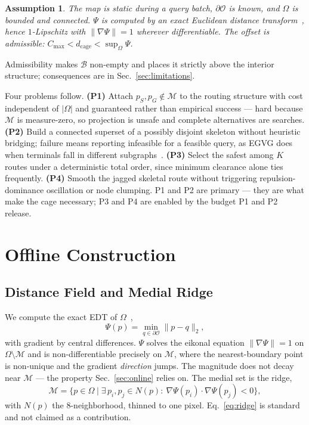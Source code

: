 \documentclass[conference]{IEEEtran}
\newtheorem{assumption}{Assumption}
\begin{document}
\begin{assumption}
\label{asm:setting}
The map is static during a query batch, $\partial\mathcal{O}$ is known, and $\Omega$ is bounded and connected. $\Psi$ is computed by an exact Euclidean distance transform~\cite{felzenszwalb2012}, hence $1$-Lipschitz with $\|\nabla\Psi\|=1$ wherever differentiable. The offset is admissible: $C_{\max}<d_{\mathrm{cage}}<\sup_{\Omega}\Psi$.
\end{assumption}

Admissibility makes $\mathcal{B}$ non-empty and places it strictly above the interior structure; consequences are in Sec.~\ref{sec:limitations}.

Four problems follow. \textbf{(P1)} Attach $p_S,p_G\notin\mathcal{M}$ to the routing structure with cost independent of $|\Omega|$ and guaranteed rather than empirical success --- hard because $\mathcal{M}$ is measure-zero, so projection is unsafe and complete alternatives are searches. \textbf{(P2)} Build a connected superset of a possibly disjoint skeleton without heuristic bridging; failure means reporting infeasible for a feasible query, as EGVG does when terminals fall in different subgraphs~\cite{qi2025egvg}. \textbf{(P3)} Select the safest among $K$ routes under a deterministic total order, since minimum clearance alone ties frequently. \textbf{(P4)} Smooth the jagged skeletal route without triggering repulsion-dominance oscillation or node clumping. P1 and P2 are primary --- they are what make the cage necessary; P3 and P4 are enabled by the budget P1 and P2 release.

\section{Offline Construction}
\label{sec:offline}

\subsection{Distance Field and Medial Ridge}

We compute the exact EDT of $\Omega$~\cite{felzenszwalb2012},
\begin{equation}
\Psi(p)=\min_{q\in\partial\mathcal{O}}\|p-q\|_2 ,
\end{equation}
with gradient by central differences. $\Psi$ solves the eikonal equation $\|\nabla\Psi\|=1$ on $\Omega\setminus\mathcal{M}$ and is non-differentiable precisely on $\mathcal{M}$, where the nearest-boundary point is non-unique and the gradient \emph{direction} jumps. The magnitude does not decay near $\mathcal{M}$ --- the property Sec.~\ref{sec:online} relies on. The medial set is the ridge,
\begin{equation}
\mathcal{M}=\{p\in\Omega \mid \exists\, p_i,p_j\in N(p):\ \nabla\Psi(p_i)\cdot\nabla\Psi(p_j)<0\},
\label{eq:ridge}
\end{equation}
with $N(p)$ the $8$-neighborhood, thinned to one pixel. Eq.~\eqref{eq:ridge} is standard and not claimed as a contribution.
\end{document}
